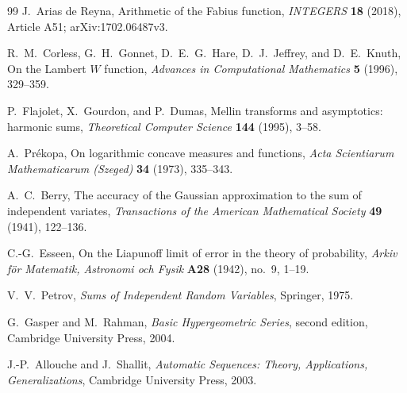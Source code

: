 \documentclass[11pt]{article}
\theoremstyle{definition}
\begin{document}
\begin{thebibliography}{99}
J.~Arias de Reyna,
\newblock Arithmetic of the Fabius function,
\newblock \emph{INTEGERS} \textbf{18} (2018), Article A51; arXiv:1702.06487v3.

R.~M.~Corless, G.~H.~Gonnet, D.~E.~G.~Hare, D.~J.~Jeffrey, and D.~E.~Knuth,
\newblock On the Lambert \(W\) function,
\newblock \emph{Advances in Computational Mathematics} \textbf{5} (1996), 329--359.

P.~Flajolet, X.~Gourdon, and P.~Dumas,
\newblock Mellin transforms and asymptotics: harmonic sums,
\newblock \emph{Theoretical Computer Science} \textbf{144} (1995), 3--58.

A.~Pr\'ekopa,
\newblock On logarithmic concave measures and functions,
\newblock \emph{Acta Scientiarum Mathematicarum (Szeged)} \textbf{34} (1973), 335--343.

A.~C.~Berry,
\newblock The accuracy of the Gaussian approximation to the sum of independent variates,
\newblock \emph{Transactions of the American Mathematical Society} \textbf{49} (1941),
122--136.

C.-G.~Esseen,
\newblock On the Liapunoff limit of error in the theory of probability,
\newblock \emph{Arkiv f\"or Matematik, Astronomi och Fysik} \textbf{A28} (1942), no.~9,
1--19.

V.~V.~Petrov,
\newblock \emph{Sums of Independent Random Variables},
\newblock Springer, 1975.

G.~Gasper and M.~Rahman,
\newblock \emph{Basic Hypergeometric Series}, second edition,
\newblock Cambridge University Press, 2004.

J.-P.~Allouche and J.~Shallit,
\newblock \emph{Automatic Sequences: Theory, Applications, Generalizations},
\newblock Cambridge University Press, 2003.

\end{thebibliography}
\end{document}

